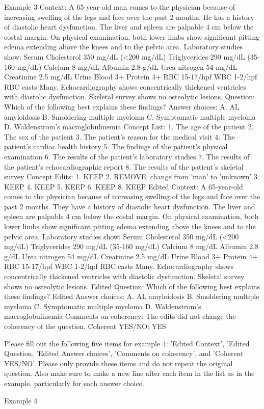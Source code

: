 \begin{promptbox}
    Example 3
    Context: A 65-year-old man comes to the physician because of increasing swelling of the legs and face over the past 2 months. He has a history of diastolic heart dysfunction. The liver and spleen are palpable 4 cm below the costal margin. On physical examination, both lower limbs show significant pitting edema extending above the knees and to the pelvic area. Laboratory studies show: Serum Cholesterol 350 mg/dL (<200 mg/dL) Triglycerides 290 mg/dL (35-160 mg/dL) Calcium 8 mg/dL Albumin 2.8 g/dL Urea nitrogen 54 mg/dL Creatinine 2.5 mg/dL Urine Blood 3+ Protein 4+ RBC 15-17/hpf WBC 1-2/hpf RBC casts Many. Echocardiography shows concentrically thickened ventricles with diastolic dysfunction. Skeletal survey shows no osteolytic lesions.
    Question: Which of the following best explains these findings?
    Answer choices:
    A. AL amyloidosis
    B. Smoldering multiple myeloma
    C. Symptomatic multiple myeloma
    D. Waldenstrom's macroglobulinemia
    Concept List:
    1. The age of the patient
    2. The sex of the patient
    3. The patient's reason for the medical visit
    4. The patient's cardiac health history
    5. The findings of the patient's physical examination
    6. The results of the patient's laboratory studies
    7. The results of the patient's echocardiographic report
    8. The results of the patient's skeletal survey
    Concept Edits:
    1. KEEP
    2. REMOVE: change from 'man' to 'unknown'
    3. KEEP
    4. KEEP
    5. KEEP
    6. KEEP
    8. KEEP
    Edited Context:  A 65-year-old comes to the physician because of increasing swelling of the legs and face over the past 2 months. They have a history of diastolic heart dysfunction. The liver and spleen are palpable 4 cm below the costal margin. On physical examination, both lower limbs show significant pitting edema extending above the knees and to the pelvic area. Laboratory studies show: Serum Cholesterol 350 mg/dL (<200 mg/dL) Triglycerides 290 mg/dL (35-160 mg/dL) Calcium 8 mg/dL Albumin 2.8 g/dL Urea nitrogen 54 mg/dL Creatinine 2.5 mg/dL Urine Blood 3+ Protein 4+ RBC 15-17/hpf WBC 1-2/hpf RBC casts Many. Echocardiography shows concentrically thickened ventricles with diastolic dysfunction. Skeletal survey shows no osteolytic lesions.
    Edited Question: Which of the following best explains these findings?
    Edited Answer choices:
    A. AL amyloidosis
    B. Smoldering multiple myeloma
    C. Symptomatic multiple myeloma
    D. Waldenstrom's macroglobulinemia
    Comments on coherency: The edits did not change the coherency of the question.
    Coherent YES/NO: YES

    Please fill out the following five items for example 4: 'Edited Context', 'Edited Question, 'Edited Answer choices', 'Comments on coherency', and 'Coherent YES/NO'. Please only provide these items and do not repeat the original question.  Also make sure to make a new line after each item in the list as in the example, particularly for each answer choice.

    Example 4
\end{promptbox}
